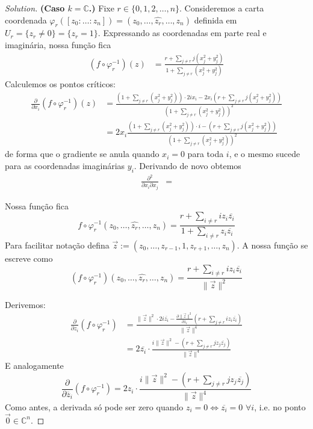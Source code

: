 \begin{proof}[Solution]
\textbf{(Caso \(k=\mathbb{C}\).)} Fixe \(r \in \{0,1,2,\ldots,n\}\). Consideremos a carta coordenada \(\varphi_r([z_0:\ldots:z_n])	= (z_0,\ldots,\widehat{z_r},\ldots,z_n)\) definida em \(U_r=\{z_r \neq 0\}=\{z_r=1\}\).  Expressando as coordenadas em parte real e imaginária, nossa função fica
\begin{align*}
	(f \circ \varphi_r^{-1})(z)&=\frac{r+\sum_{j \neq  r}j(x_j^2+y_j^2)}{1+\sum_{j \neq r}(x_j^2+y_j^2)}
\end{align*}
Calculemos os pontos críticos:
\begin{align*}
\frac{\partial }{\partial x_i}(f \circ \varphi_r^{-1})(z)&=\frac{\left(1+\sum_{j \neq r}(x_j^2+y_j^2)\right)\cdot 2ix_i-2x_i\left(r+\sum_{j \neq r}j(x_j^2+y_j^2)\right) }{\left(1+\sum_{j \neq  r}(x_j^2+y_j^2)\right)^2}\\
&=2x_i\frac{\left(1+\sum_{j \neq r}(x_j^2+y_j^2)\right)\cdot i-\left(r+\sum_{j \neq r}j(x_j^2+y_j^2)\right) }{\left(1+\sum_{j \neq  r}(x_j^2+y_j^2)\right)^2}
\end{align*}
de forma que o gradiente se anula quando \(x_i=0\) para toda \(i\), e o mesmo sucede para as coordenadas imaginárias \(y_i\). Derivando de novo obtemos
\begin{align*}
\frac{\partial^2 }{\partial x_i\partial x_j}&=
\end{align*}

\clearpage



Nossa função fica
	\[f \circ \varphi_r^{-1}(z_0,\ldots,\widehat{z_r},\ldots,z_n)=\frac{r+\sum_{i\neq r}iz_i\overline{z_i}}{1+\sum_{i\neq r}z_i\overline{z_i}}\]
Para facilitar notação defina \(\vec{z}:=(z_0,\ldots,z_{r-1},1,z_{r+1},\ldots,z_n)\). A nossa função se escreve como
\[(f \circ \varphi_r^{-1})(z_0,\ldots,\widehat{z_r},\ldots,z_n)=\frac{r+\sum_{i\neq r}iz_i\overline{z_i}}{\|\vec{z}\|^2}\]

Derivemos:
\begin{align*}
\frac{\partial }{\partial z_i}(f \circ \varphi_r^{-1})&=\frac{\|\vec{z}\|^2\cdot 2i\overline{z_i}-\frac{\partial \|\vec{z}\|^2}{\partial z_i}\left(r+\sum_{j \neq r}iz_i\overline{z_i}\right) }{\|\vec{z}\|^4}\\
&=2\overline{z_i}\cdot  \frac{i \|\vec{z}\|^2-\left(r+\sum_{j \neq r}jz_j\overline{z_j}\right) }{\|\vec{z}\|^4}
\end{align*}
E analogamente
\[\frac{\partial }{\partial \overline{z}_i}(f \circ \varphi_r^{-1})=2z_i\cdot  \frac{i \|\vec{z}\|^2-\left(r+\sum_{j \neq r}jz_j\overline{z_j}\right) }{\|\vec{z}\|^4}
\]
Como antes, a derivada só pode ser zero quando \(z_i=0 \iff \overline{z_i}=0\) \(\forall i\), i.e. no ponto \(\vec{0}\in \mathbb{C}^n\).


\end{proof}
